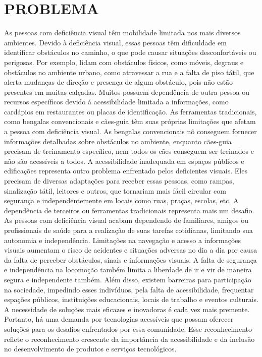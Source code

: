 \section{PROBLEMA}
As pessoas com deficiência visual têm mobilidade limitada nos mais diversos ambientes. Devido à deficiência visual, essas pessoas têm dificuldade em identificar obstáculos no caminho, o que pode causar situações desconfortáveis ou perigosas. Por exemplo, lidam com obstáculos físicos, como móveis, degraus e obstáculos no ambiente urbano, como atravessar a rua e a falta de piso tátil, que alerta mudanças de direção e presença de algum obstáculo, pois não estão presentes em muitas calçadas. Muitos possuem dependência de outra pessoa ou recursos específicos devido à acessibilidade limitada a informações, como cardápios em restaurantes ou placas de identificação.
As ferramentas tradicionais, como bengalas convencionais e cães-guia têm suas próprias limitações que afetam a pessoa com deficiência visual. As bengalas convencionais nõ conseguem fornecer informações detalhadas sobre obstáculos no ambiente, enquanto cães-guia precisam de treinamento específico, nem todos os cães conseguem ser treinados e não são acessíveis a todos.
A acessibilidade inadequada em espaços públicos e edificações representa outro problema enfrentado pelos deficientes visuais. Eles precisam de diversas adaptações para receber essas pessoas, como rampas, sinalização tátil, leitores e outros, que tornariam mais fácil circular com segurança e independentemente em locais como ruas, praças, escolas, etc.
A dependência de terceiros ou ferramentas tradicionais representa mais um desafio. As pessoas com deficiência visual acabam dependendo de familiares, amigos ou profissionais de saúde para a realização de suas tarefas cotidianas, limitando sua autonomia e independência.
Limitações na navegação e acesso a informações visuais aumentam o risco de acidentes e situações adversas no dia a dia por causa da falta de perceber obstáculos, sinais e informações visuais. A falta de segurança e independência na locomoção também limita a liberdade de ir e vir de maneira segura e independente também.
Além disso, existem barreiras para participação na sociedade, impedindo esses indivíduos, pela falta de acessibilidade, frequentar espações públicos, instituições educacionais, locais de trabalho e eventos culturais.
A necessidade de soluções mais eficazes e inovadoras é cada vez mais premente. Portanto, há uma demanda por tecnologias acessíveis que possam oferecer soluções para os desafios enfrentados por essa comunidade. Esse reconhecimento reflete o reconhecimento crescente da importância da acessibilidade e da inclusão no desenvolvimento de produtos e serviços tecnológicos.

